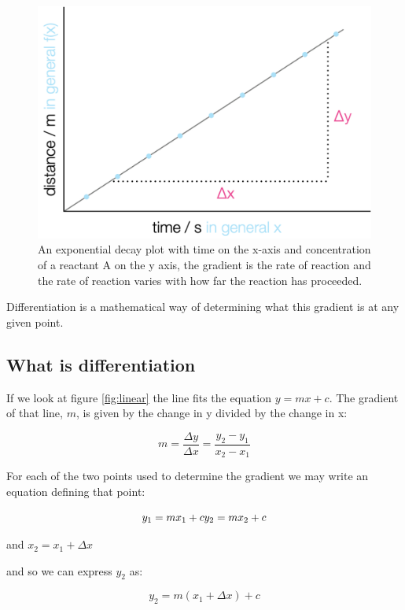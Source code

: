 \documentclass[
]{book}
\begin{document}
\begin{figure}

{\centering \includegraphics[width=0.5\linewidth]{images/linearplot} 

}

\caption{An exponential decay plot with time on the x-axis and concentration of a reactant A on the y axis, the gradient is the rate of reaction and the rate of reaction varies with how far the reaction has proceeded.}\label{fig:expplot}
\end{figure}

Differentiation is a mathematical way of determining what this gradient is at any given point.

\hypertarget{subsec:whatisdiff}{%
\subsection{What is differentiation}\label{subsec:whatisdiff}}

If we look at figure \ref{fig:linear} the line fits the equation \(y = mx+c\). The gradient of that line, \(m\), is given by the change in y divided by the change in x:

\begin{equation*}
m = \frac{\Delta y}{\Delta x} = \frac{y_2-y_1}{x_2-x_1}
\end{equation*}

For each of the two points used to determine the gradient we may write an equation defining that point:

\begin{equation*}
y_1 = mx_1 + c\\
y_2 = mx_2 + c
\end{equation*}

and \(x_2 = x_1+\Delta x\)

and so we can express \(y_2\) as:

\begin{equation*}
y_2 = m(x_1+ \Delta x) + c
\end{equation*}
\end{document}
